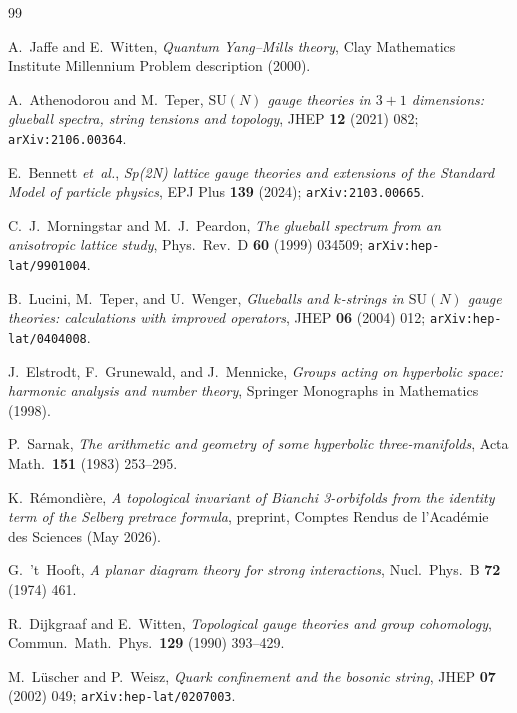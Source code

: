 \documentclass[aps,prl,reprint,superscriptaddress,floatfix,nofootinbib,amssymb]{revtex4-2}
\theoremstyle{definition}
\theoremstyle{remark}
\begin{document}
\begin{thebibliography}{99}

A.~Jaffe and E.~Witten,
\emph{Quantum Yang--Mills theory},
Clay Mathematics Institute Millennium Problem description (2000).

A.~Athenodorou and M.~Teper,
\emph{$\mathrm{SU}(N)$ gauge theories in $3{+}1$ dimensions: glueball
spectra, string tensions and topology},
JHEP \textbf{12} (2021) 082; \texttt{arXiv:2106.00364}.

E.~Bennett \emph{et~al.},
\emph{Sp(2N) lattice gauge theories and extensions of the
Standard Model of particle physics},
EPJ Plus \textbf{139} (2024); \texttt{arXiv:2103.00665}.

C.~J.~Morningstar and M.~J.~Peardon,
\emph{The glueball spectrum from an anisotropic lattice study},
Phys.~Rev.~D \textbf{60} (1999) 034509;
\texttt{arXiv:hep-lat/9901004}.

B.~Lucini, M.~Teper, and U.~Wenger,
\emph{Glueballs and $k$-strings in $\mathrm{SU}(N)$ gauge theories:
calculations with improved operators},
JHEP \textbf{06} (2004) 012; \texttt{arXiv:hep-lat/0404008}.

J.~Elstrodt, F.~Grunewald, and J.~Mennicke,
\emph{Groups acting on hyperbolic space: harmonic analysis and number
theory}, Springer Monographs in Mathematics (1998).

P.~Sarnak,
\emph{The arithmetic and geometry of some hyperbolic three-manifolds},
Acta Math.~\textbf{151} (1983) 253--295.

K.~R\'emondi\`ere,
\emph{A topological invariant of Bianchi 3-orbifolds from the
identity term of the Selberg pretrace formula},
preprint, Comptes Rendus de l'Acad\'emie des Sciences (May 2026).

G.~'t~Hooft,
\emph{A planar diagram theory for strong interactions},
Nucl.~Phys.~B \textbf{72} (1974) 461.

R.~Dijkgraaf and E.~Witten,
\emph{Topological gauge theories and group cohomology},
Commun.~Math.~Phys.~\textbf{129} (1990) 393--429.

M.~L\"uscher and P.~Weisz,
\emph{Quark confinement and the bosonic string},
JHEP \textbf{07} (2002) 049; \texttt{arXiv:hep-lat/0207003}.


\end{thebibliography}
\end{document}
